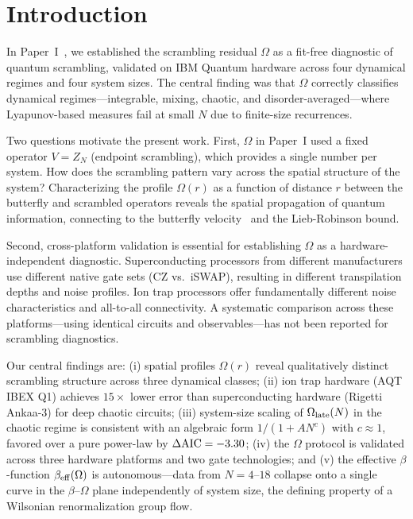 \documentclass[twocolumn,showpacs,preprintnumbers,amsmath,amssymb,aps,prl]{revtex4-2}
\begin{document}
\maketitle

\section{Introduction}

In Paper~I~\cite{PerezEugenio2026a}, we established the scrambling residual
$\Omega$ as a fit-free diagnostic of quantum scrambling, validated on IBM Quantum
hardware across four dynamical regimes and four system sizes. The central finding
was that $\Omega$ correctly classifies dynamical regimes---integrable, mixing,
chaotic, and disorder-averaged---where Lyapunov-based measures fail at small $N$
due to finite-size recurrences.

Two questions motivate the present work. First, $\Omega$ in Paper~I used a fixed
operator $V = Z_N$ (endpoint scrambling), which provides a single number per
system. How does the scrambling pattern vary across the spatial structure of the
system? Characterizing the profile $\Omega(r)$ as a function of distance $r$
between the butterfly and scrambled operators reveals the spatial propagation of
quantum information, connecting to the butterfly velocity~\cite{vonKeyserlingk2018,NahumVijayHaah2018} and the Lieb-Robinson bound.

Second, cross-platform validation is essential for establishing $\Omega$ as a
hardware-independent diagnostic. Superconducting processors from different
manufacturers use different native gate sets (CZ vs.\ iSWAP), resulting in
different transpilation depths and noise profiles. Ion trap processors offer fundamentally
different noise characteristics and all-to-all connectivity. A systematic
comparison across these platforms---using identical circuits and observables---has
not been reported for scrambling diagnostics.

Our central findings are: (i) spatial profiles $\Omega(r)$ reveal qualitatively
distinct scrambling structure across three dynamical classes; (ii) ion trap
hardware (AQT IBEX Q1) achieves $15\times$ lower error than superconducting
hardware (Rigetti Ankaa-3) for deep chaotic circuits; (iii) system-size scaling
of $\Omega_{\rm late}(N)$ in the chaotic regime is consistent with an algebraic
form $1/(1+AN^c)$ with $c \approx 1$, favored over a pure power-law by
$\Delta{\rm AIC} = -3.30$; (iv) the $\Omega$ protocol is validated across
three hardware platforms and two gate technologies; and (v) the effective
$\beta$-function $\beta_{\rm eff}(\Omega)$ is autonomous---data from $N = 4$--$18$
collapse onto a single curve in the $\beta$--$\Omega$ plane independently of
system size, the defining property of a Wilsonian renormalization group flow.
\end{document}
